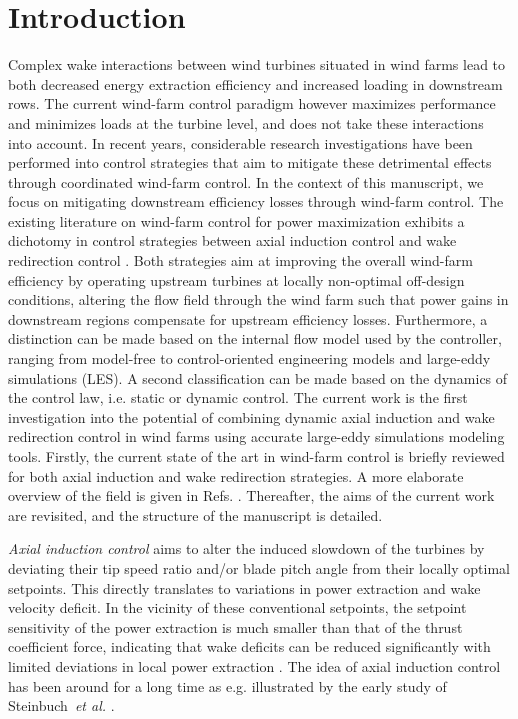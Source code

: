 \documentclass[energies,article,submit,moreauthors,latex,10pt,a4paper]{mdpi}
\begin{document}
\section{Introduction}
\noindent Complex wake interactions between wind turbines situated in wind farms lead to both decreased energy extraction efficiency and increased loading in downstream rows. The current wind-farm control paradigm however maximizes performance and minimizes loads at the turbine level, and does not take these interactions into account. In recent years, considerable research investigations have been performed into control strategies that aim to mitigate these detrimental effects through coordinated wind-farm control. In the context of this manuscript, we focus on mitigating downstream efficiency losses through wind-farm control. The existing literature on wind-farm control for power maximization exhibits a dichotomy in control strategies between axial induction control and wake redirection control \cite{boersma2017tutorial}. Both strategies aim at improving the overall wind-farm efficiency by operating upstream turbines at locally non-optimal off-design conditions, altering the flow field through the wind farm such that power gains in downstream regions compensate for upstream efficiency losses. Furthermore, a distinction can be made based on the internal flow model used by the controller, ranging from model-free to control-oriented engineering models and large-eddy simulations (LES). A second classification can be made based on the dynamics of the control law, i.e. static or dynamic control. The current work is the first investigation into the potential of combining dynamic axial induction and wake redirection control in wind farms using accurate large-eddy simulations modeling tools. Firstly, the current state of the art in wind-farm control is briefly reviewed for both axial induction and wake redirection strategies. A more elaborate overview of the field is given in Refs. \cite{boersma2017tutorial, knudsen2015survey}. Thereafter, the aims of the current work are revisited, and the structure of the manuscript is detailed.

\emph{Axial induction control} aims to alter the induced slowdown of the turbines by deviating their tip speed ratio and/or blade pitch angle from their locally optimal setpoints. This directly translates to variations in power extraction and wake velocity deficit. In the vicinity of these conventional setpoints, the setpoint sensitivity of the power extraction is much smaller than that of the thrust coefficient force, indicating that wake deficits can be reduced significantly with limited deviations in local power extraction \cite{annoni2016analysis}. The idea of axial induction control has been around for a long time as e.g. illustrated by the early study of Steinbuch~\emph{et al.} \cite{steinbuch}. 
\end{document}
